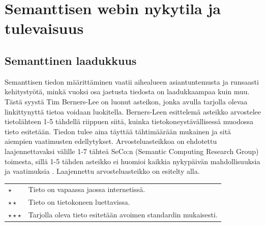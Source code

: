 \documentclass[finnish, 12pt, a4paper, elec, utf8, pdfa, online]{aaltothesis}
\begin{document}
{%

\clearpage
\section{Semanttisen webin nykytila ja tulevaisuus}






\subsection{Semanttinen laadukkuus} %
Semanttisen tiedon määrittäminen vaatii aihealueen asiantuntemusta ja runsaasti kehitystyötä, minkä vuoksi osa jaetusta tiedosta on laadukkaampaa kuin muu. Tästä syystä Tim Berners-Lee on luonut asteikon, jonka avulla tarjolla olevaa linkittynyttä tietoa voidaan luokitella. Berners-Leen esittelemä asteikko arvostelee tietolähteen 1-5 tähdellä riippuen siitä, kuinka tietokoneystävällisessä muodossa tieto esitetään. Tiedon tulee aina täyttää tähtimäärään mukainen ja sitä aiempien vaatimusten edellytykset. Arvosteluasteikkoa on ehdotettu laajennettavaksi välille 1-7 tähteä SeCo:n (Semantic Computing Research Group) toimesta, sillä 1-5 tähden asteikko ei huomioi kaikkia nykypäivän mahdollisuuksia ja vaatimuksia \cite{SeCo_stars}. Laajennettu arvosteluasteikko on esitelty alla.

\begin{tabular}{ll}
\vspace*{0.2cm}
$\star$                     & Tieto on vapaassa jaossa internetissä. \\
\vspace*{0.2cm}
$\star \star$                & Tieto on tietokoneen luettavissa. \\
\vspace*{0.2cm}
$\star\star\star$           & Tarjolla oleva tieto esitetään avoimen standardin mukaisesti. \\


\end{tabular}}
\end{document}
